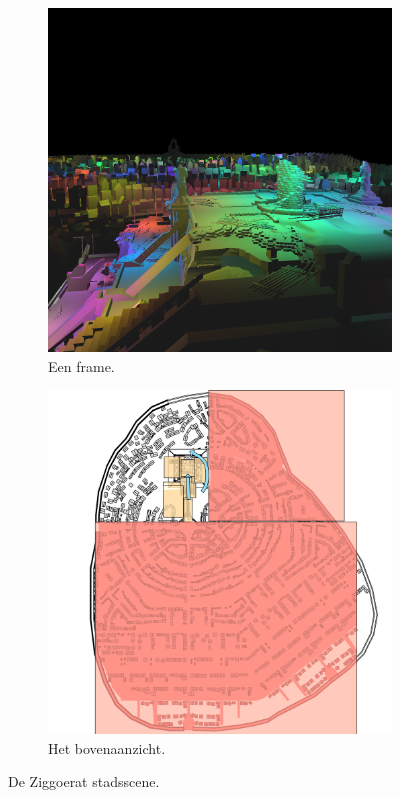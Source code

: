 \begin{figure}[t]
  \begin{subfigure}[b]{0.54\textwidth}
    \centering\includegraphics[width=\textwidth]{./img/raw/test-suite-ziggurat-city-frame.png}
    \caption{Een frame.}
    \label{fig:test-suite-ziggurat-frame}
  \end{subfigure} %
  \begin{subfigure}[b]{0.44\textwidth}
    \centering\includegraphics[width=\textwidth]{./img/raw/test-suite-ziggurat-map.png}
    \caption{Het bovenaanzicht.}
    \label{fig:test-suite-ziggurat-map}
  \end{subfigure}
  \caption{De Ziggoerat stadsscene.}
  \label{fig:test-suite-ziggurat-city}
\end{figure}
